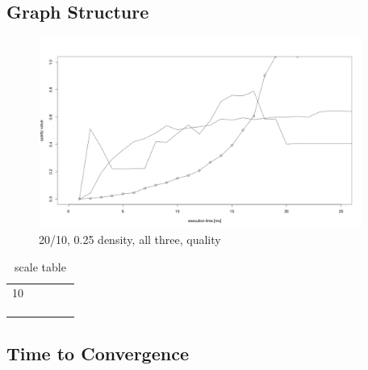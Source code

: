 \subsection{Graph Structure}
\begin{figure}[H]
\includegraphics[width=400px]{graphics/experiments/static/quality/sq_2}
\centering
\caption{20/10, 0.25 density, all three, quality}
\label{fig:mgm_graph}
\end{figure}

\begin{table}[h]
\begin{tabular}{lllll}
10 &  &  &  &  \\
   &  &  &  &  \\
   &  &  &  &  \\
   &  &  &  & 
\end{tabular}
\caption{scale table}
\end{table}


\subsection{Time to Convergence}


